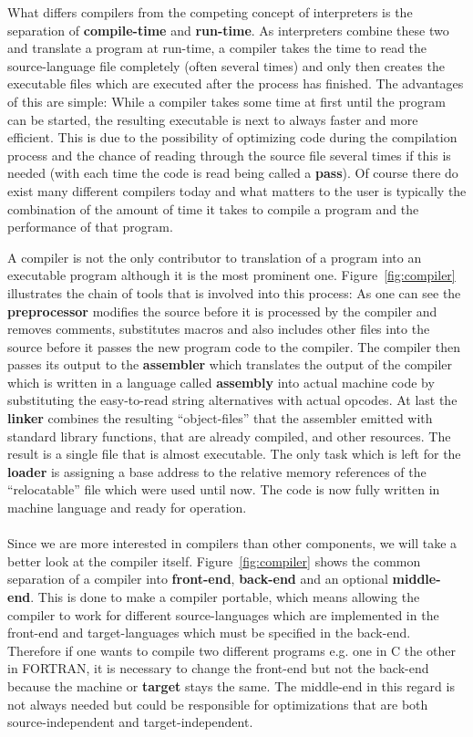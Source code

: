 What differs compilers from the competing concept of interpreters is the separation of \textbf{compile-time} and \textbf{run-time}.
As interpreters combine these two and translate a program at run-time, a compiler takes the time to read the source-language file completely (often several times) and only then creates the executable files which are executed after the process has finished.
The advantages of this are simple:
While a compiler takes some time at first until the program can be started, the resulting executable is next to always faster and more efficient.
This is due to the possibility of optimizing code during the compilation process and the chance of reading through the source file several times if this is needed (with each time the code is read being called a \textbf{pass}).
Of course there do exist many different compilers today and what matters to the user is typically the combination of the amount of time it takes to compile a program and the performance of that program.

A compiler is not the only contributor to translation of a program into an executable program although it is the most prominent one.
Figure~\ref{fig:compiler} illustrates the chain of tools that is involved into this process:
As one can see the \textbf{preprocessor} modifies the source before it is processed by the compiler and removes comments, substitutes macros and also includes other files into the source before it passes the new program code to the compiler.
The compiler then passes its output to the \textbf{assembler} which translates the output of the compiler which is written in a language called \textbf{assembly} into actual machine code by substituting the easy-to-read string alternatives with actual opcodes.
At last the \textbf{linker} combines the resulting ``object-files'' that the assembler emitted with standard library functions, that are already compiled, and other resources. 
The result is a single file that is almost executable.
The only task which is left for the \textbf{loader} is assigning a base address to the relative memory references of the ``relocatable'' file which were used until now.
The code is now fully written in machine language and ready for operation.
\\
\\
Since we are more interested in compilers than other components, we will take a better look at the compiler itself.
Figure~\ref{fig:compiler} shows the common separation of a compiler into \textbf{front-end}, \textbf{back-end} and an optional \textbf{middle-end}.
This is done to make a compiler portable, which means allowing the compiler to work for different source-languages which are implemented in the front-end and target-languages which must be specified in the back-end.
Therefore if one wants to compile two different programs e.g. one in C the other in FORTRAN, it is necessary to change the front-end but not the back-end because the machine or \textbf{target} stays the same.
The middle-end in this regard is not always needed but could be responsible for optimizations that are both source-independent and target-independent.

